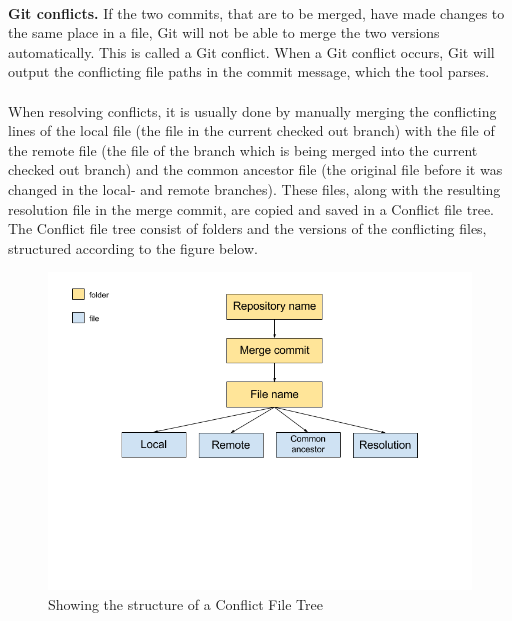 \paragraph*{}
\textbf{Git conflicts.} If the two commits, that are to be merged, have made changes to the same place in a file, Git will not be able to merge the two versions automatically. This is called a Git conflict. When a Git conflict occurs, Git will output the conflicting file paths in the commit message, which the tool parses.
\paragraph*{}
When resolving conflicts, it is usually done by manually merging the conflicting lines of the local file (the file in the current checked out branch) with the file of the remote file (the file of the branch which is being merged into the current checked out branch) and the common ancestor file (the original file before it was changed in the local- and remote branches). These files, along with the resulting resolution file in the merge commit, are copied and saved in a Conflict file tree. The Conflict file tree consist of folders and the versions of the conflicting files, structured according to the figure below.\\
\begin{figure}[H]
\centering
\includegraphics[width=400pt]{figure/conflicts.png}
\caption{Showing the structure of a Conflict File Tree}
\end{figure}

